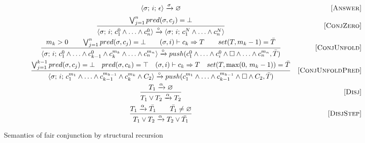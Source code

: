 \begin{figure}[h!]
\[\begin{array}{cr}

      {\langle \sigma;\, i;\, \epsilon \rangle \xrightarrow{\sigma} \varnothing}  
&     \mbox{[\textsc{Answer}]} \\[2mm]
\dfrac{\bigvee_{j=1}^n pred(\sigma, c_j) = \bot}
      {\langle \sigma;\, i;\, c_1^0 \land \ldots \land c_n^0 \rangle \xrightarrow{\circ} \langle \sigma;\, i;\, c_1^N \land \ldots \land c_n^N \rangle}
&     \mbox{[\textsc{ConjZero}]} \\[4mm]
\dfrac{m_k > 0 \qquad \bigvee_{j=1}^n pred(\sigma, c_j) = \bot \qquad (\sigma, i) \vdash c_k \Rightarrow T \qquad set(T, m_k - 1) = \bar{T}}
      {\langle \sigma;\, i;\, c_1^0 \land \ldots \land c_{k-1}^0 \land c_k^{m_k} \land \ldots \land c_n^{m_n} \rangle \xrightarrow{\circ} push(c_1^0 \land \ldots \land c_i^0 \land \Box \land \ldots \land c_n^{m_n}, \bar{T})}
&     \mbox{[\textsc{ConjUnfold}]} \\[4mm]
\dfrac{\bigvee_{j=1}^{k-1} pred(\sigma, c_j) = \bot \quad pred(\sigma, c_k) = \top \quad (\sigma, i) \vdash c_k \Rightarrow T \quad set(T, \max(0, \, m_k - 1)) = \bar{T}}
      {\langle \sigma;\, i;\, c_1^{m_1} \land \ldots \land c_{k-1}^{m_{k-1}} \land c_k^{m_k} \land C_2 \rangle \xrightarrow{\circ} push(c_1^{m_1} \land \ldots \land c_{k-1}^{m_{k-1}} \land \Box \land C_2, \bar{T})}
&     \mbox{[\textsc{ConjUnfoldPred}]} \\[4mm]
\dfrac{T_1 \xrightarrow{\alpha} \varnothing}
      {T_1 \lor T_2 \xrightarrow{\alpha} T_2}
&     \mbox{[\textsc{Disj}]} \\[4mm]
\dfrac{T_1 \xrightarrow{\alpha} \bar{T_1} \qquad \bar{T_1} \not= \varnothing}
      {T_1 \lor T_2 \xrightarrow{\alpha} T_2 \lor\bar{T_1}}
&     \mbox{[\textsc{DisjStep}]}
\end{array}\]
\caption{Semantics of fair conjunction by structural recursion}
\label{fair:structural-recursion-semantics}
\end{figure}

